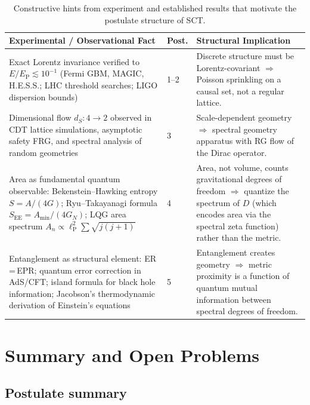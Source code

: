 \documentclass[12pt,a4paper]{article}
\theoremstyle{postulate}
\newcommand{\Dirac}{D}
\newcommand{\planck}{\ell_{\mathrm{P}}}
\newcommand{\Eplanck}{E_{\mathrm{P}}}
\begin{document}
\begin{table}[ht]
\centering
\renewcommand{\arraystretch}{1.3}
\begin{tabular}{@{}p{}p{}p{}@{}}
\toprule
\textbf{Experimental / Observational Fact} & \textbf{Post.} &
\textbf{Structural Implication} \\
\midrule
Exact Lorentz invariance verified to $E/\Eplanck \lesssim 10^{-1}$
(Fermi GBM, MAGIC, H.E.S.S.; LHC threshold searches; LIGO dispersion
bounds) &
1--2 &
Discrete structure must be Lorentz-covariant $\Rightarrow$ Poisson
sprinkling on a causal set, not a regular lattice. \\
\addlinespace
Dimensional flow $d_S: 4 \to 2$ observed in CDT lattice simulations,
asymptotic safety FRG, and spectral analysis of random geometries &
3 &
Scale-dependent geometry $\Rightarrow$ spectral geometry apparatus with
RG flow of the Dirac operator. \\
\addlinespace
Area as fundamental quantum observable: Bekenstein--Hawking entropy
$S = A/(4G)$; Ryu--Takayanagi formula $S_{\mathrm{EE}} = A_{\min}/(4G_N)$;
LQG area spectrum $A_n \propto \planck^2 \sum \sqrt{j(j+1)}$ &
4 &
Area, not volume, counts gravitational degrees of freedom $\Rightarrow$
quantize the spectrum of $\Dirac$ (which encodes area via the spectral zeta
function) rather than the metric. \\
\addlinespace
Entanglement as structural element: ER\,=\,EPR; quantum error correction in
AdS/CFT; island formula for black hole information; Jacobson's thermodynamic
derivation of Einstein's equations &
5 &
Entanglement creates geometry $\Rightarrow$ metric proximity is a function
of quantum mutual information between spectral degrees of freedom. \\
\bottomrule
\end{tabular}
\caption{Constructive hints from experiment and established results that
  motivate the postulate structure of SCT.}
\label{tab:hints}
\end{table}


\section{Summary and Open Problems}\label{sec:summary}

\subsection{Postulate summary}
\end{document}
